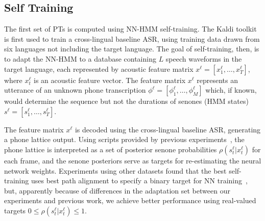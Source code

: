 \subsection{Self Training}
\label{sec:selftraining}

The first set of PTs is computed using NN-HMM self-training.
The Kaldi toolkit~\cite{Kaldi2011} is first used to train a
cross-lingual baseline ASR, using training data drawn from six
languages not including the target language.  The goal of
self-training, then, is to adapt the NN-HMM to a database containing
$L$ speech waveforms in the target language, each represented by
acoustic feature matrix $x^\ell =[x_1^\ell,\ldots,x_T^\ell]$, where
$x_t^\ell$ is an acoustic feature vector.  The feature matrix $x^\ell$
represents an utterance of an unknown phone transcription
$\phi^\ell=[\phi_1^\ell,\ldots,\phi_M^\ell]$ which, if known, would
determine the sequence but not the durations of senones (HMM states)
$s^\ell =[s_1^\ell,\ldots,s_T^\ell]$.

The feature matrix $x^\ell$ is decoded using the cross-lingual
baseline ASR, generating a phone lattice output.  Using scripts
provided by previous experiments~\cite{vesely2013-semi}, the phone
lattice is interpreted as a set of posterior senone probabilities
$\rho(s_t^\ell|x_t^\ell)$ for each frame, and the senone posteriors
serve as targets for re-estimating the neural network weights.
Experiments using other datasets found that the best self-training
uses best path alignment to specify a binary target for NN
training~\cite{vesely2013-semi}, but, apparently because of
differences in the adaptation set between our experiments and previous
work, we achieve better performance using real-valued targets
$0\le\rho(s_t^\ell|x_t^\ell)\le 1$.
